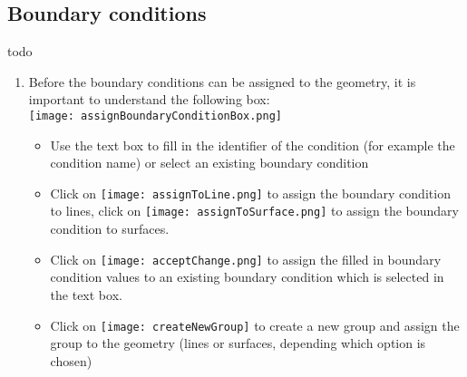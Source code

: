 \subsection{Boundary conditions}
todo 
\begin{enumerate}
		\setlength\itemsep{2mm}
	\item Before the boundary conditions can be assigned to the geometry, it is important to understand the following box:\\	
	\texttt{[image: assignBoundaryConditionBox.png]}
	\begin{itemize}
		\item Use the text box to fill in the identifier of the condition (for example the condition name) or select an existing boundary condition
		\item Click on  \texttt{[image: assignToLine.png]} to assign the boundary condition to lines, click on \texttt{[image: assignToSurface.png]}  to assign the boundary condition to surfaces.
		\item  Click on \texttt{[image: acceptChange.png]}  to assign the filled in boundary condition values to an existing boundary condition which is selected in the text box.
		\item Click on \texttt{[image: createNewGroup]}  to create a new group and assign the group to the geometry (lines or surfaces, depending which option is chosen)
	\end{itemize}

\end{enumerate}
